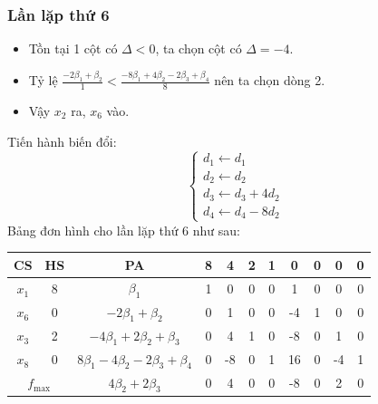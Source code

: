 \documentclass[12pt]{article}
\begin{document}
\subsubsection{Lần lặp thứ 6}
\begin{itemize}
\item Tồn tại 1 cột có $\Delta < 0$, ta chọn cột có $\Delta = -4$.
\item Tỷ lệ $\displaystyle \frac{-2\beta_1 + \beta_2}{1} < \frac{-8\beta_1 + 4\beta_2 - 2\beta_3 + \beta_4}{8}$ nên ta chọn dòng 2.
\item Vậy $x_2$ ra, $x_6$ vào.
\end{itemize}
Tiến hành biến đổi:
$$
\left\{
\begin{array}{lll}
d_1 \leftarrow d_1 \\
d_2 \leftarrow d_2 \\
d_3 \leftarrow d_3 + 4d_2\\
d_4 \leftarrow d_4 - 8d_2
\end{array}
\right.
$$
Bảng đơn hình cho lần lặp thứ 6 như sau:
\begin{table}[H]
\centering
\begin{tabular}{|c|c|c|c|c|c|c|c|c|c|c|}
\hline
CS & HS & PA & 8 & 4 & 2 & 1 & 0 & 0 & 0 & 0 \\
\hline
$x_1$ & 8 & $\beta_1$ & 1 & 0 & 0 & 0 & 1 & 0 & 0 & 0 \\
$x_6$ & 0 & $-2\beta_1 + \beta_2$ & 0 & 1 & 0 & 0 & -4 & 1 & 0 & 0 \\
$x_3$ & 2 & $-4\beta_1 + 2\beta_2 + \beta_3$ & 0 & 4 & 1 & 0 & -8 & 0 & 1 & 0 \\
$x_8$ & 0 & $8\beta_1 - 4\beta_2 - 2\beta_3 + \beta_4$ & 0 & -8 & 0 & 1 & 16 & 0 & -4 & 1 \\
\hline
\multicolumn{2}{|c|}{$f_{\max}$}
& $4\beta_2 + 2\beta_3$ & 0 & 4 & 0 & 0 & -8 & 0 & 2 & 0 \\
\hline
\end{tabular}
\end{table}
\end{document}
